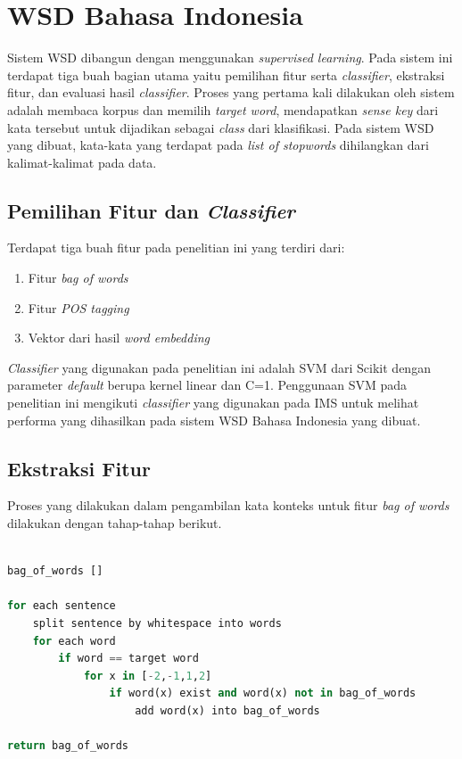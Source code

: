 \section{WSD Bahasa Indonesia}
Sistem WSD dibangun dengan menggunakan \textit{supervised learning}. Pada sistem ini terdapat tiga buah bagian utama yaitu pemilihan fitur serta \textit{classifier}, ekstraksi fitur, dan evaluasi hasil \textit{classifier}. Proses yang pertama kali dilakukan oleh sistem adalah membaca korpus dan memilih \textit{target word}, mendapatkan \textit{sense key} dari kata tersebut untuk dijadikan sebagai \textit{class} dari klasifikasi. Pada sistem WSD yang dibuat, kata-kata yang terdapat pada \textit{list of stopwords} dihilangkan dari kalimat-kalimat pada data.

\subsection{Pemilihan Fitur dan \textit{Classifier}}
Terdapat tiga buah fitur pada penelitian ini yang terdiri dari:

\begin{enumerate}
	\item Fitur \textit{bag of words}
	\item Fitur \textit{POS tagging}
	\item Vektor dari hasil \textit{word embedding}
\end{enumerate}

\textit{Classifier} yang digunakan pada penelitian ini adalah SVM dari Scikit \citep{scikit-learn} dengan parameter \textit{default} berupa kernel linear dan C=1. Penggunaan SVM pada penelitian ini mengikuti \textit{classifier} yang digunakan pada IMS \cite{zhong2010makes} untuk melihat performa yang dihasilkan pada sistem WSD Bahasa Indonesia yang dibuat.

\subsection{Ekstraksi Fitur}
Proses yang dilakukan dalam pengambilan kata konteks untuk fitur \textit{bag of words} dilakukan dengan tahap-tahap berikut.

\begin{lstlisting}[language=python,caption={Fitur Bag of Words}, label={fitur-bag-of-words}]

bag_of_words []

for each sentence
	split sentence by whitespace into words
	for each word
		if word == target word
			for x in [-2,-1,1,2]
				if word(x) exist and word(x) not in bag_of_words
					add word(x) into bag_of_words

return bag_of_words

\end{lstlisting}

